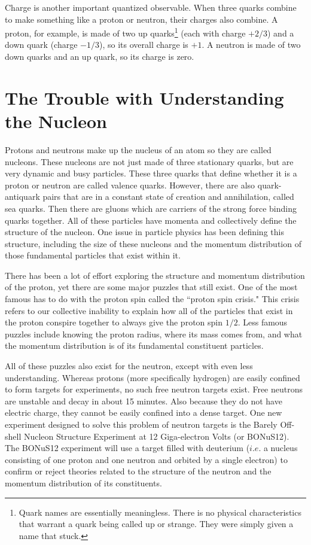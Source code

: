 Charge is another important quantized observable. When three quarks combine to make something like a proton or neutron, their charges also combine. A proton, for example, is made of two up quarks\footnote{Quark names are essentially meaningless. There is no physical characteristics that warrant a quark being called up or strange. They were simply given a name that stuck.} (each with charge $+2/3$) and a down quark (charge $-1/3$), so its overall charge is $+1$. A neutron is made of two down quarks and an up quark, so its charge is zero.

\section{The Trouble with Understanding the Nucleon}
Protons and neutrons make up the nucleus of an atom so they are called nucleons. These nucleons are not just made of three stationary quarks, but are very dynamic and busy particles. These three quarks that define whether it is a proton or neutron are called valence quarks. However, there are also quark-antiquark pairs that are in a constant state of creation and annihilation, called sea quarks. Then there are gluons which are carriers of the strong force binding quarks together. All of these particles have momenta and collectively define the structure of the nucleon. One issue in particle physics has been defining this structure, including the size of these nucleons and the momentum distribution of those fundamental particles that exist within it.

There has been a lot of effort exploring the structure and momentum distribution of the proton, yet there are some major puzzles that still exist. One of the most famous has to do with the proton spin called the ``proton spin crisis." This crisis refers to our collective inability to explain how all of the particles that exist in the proton conspire together to always give the proton spin $1/2$. Less famous puzzles include knowing the proton radius, where its mass comes from, and what the momentum distribution is of its fundamental constituent particles.

All of these puzzles also exist for the neutron, except with even less understanding. Whereas protons (more specifically hydrogen) are easily confined to form targets for experiments, no such free neutron targets exist. Free neutrons are unstable and decay in about 15 minutes. Also because they do not have electric charge, they cannot be easily confined into a dense target. One new experiment designed to solve this problem of neutron targets is the Barely Off-shell Nucleon Structure Experiment at 12 Giga-electron Volts (or BONuS12). The BONuS12 experiment will use a target filled with deuterium ($i.e.$ a nucleus consisting of one proton and one neutron and orbited by a single electron) to confirm or reject theories related to the structure of the neutron and the momentum distribution of its constituents.
 
